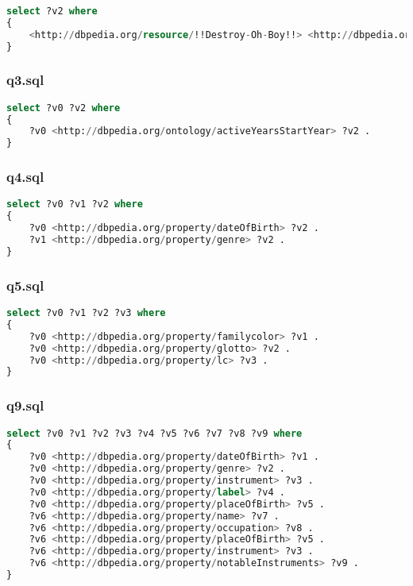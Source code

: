 \documentclass[titlepage, a4paper, 12pt] {article}
\begin{document}
\begin{lstlisting}[language=SQL] 
select ?v2 where
{
	<http://dbpedia.org/resource/!!Destroy-Oh-Boy!!> <http://dbpedia.org/property/title> ?v2 .
}
\end{lstlisting}

\subsubsection{q3.sql}

\begin{lstlisting}[language=SQL] 
select ?v0 ?v2 where
{
	?v0 <http://dbpedia.org/ontology/activeYearsStartYear> ?v2 .
}
\end{lstlisting}

\subsubsection{q4.sql}

\begin{lstlisting}[language=SQL] 
select ?v0 ?v1 ?v2 where
{
	?v0 <http://dbpedia.org/property/dateOfBirth> ?v2 .
	?v1 <http://dbpedia.org/property/genre> ?v2 .
}
\end{lstlisting}

\subsubsection{q5.sql}

\begin{lstlisting}[language=SQL] 
select ?v0 ?v1 ?v2 ?v3 where
{
	?v0 <http://dbpedia.org/property/familycolor> ?v1 .
	?v0 <http://dbpedia.org/property/glotto> ?v2 .
	?v0 <http://dbpedia.org/property/lc> ?v3 .
}
\end{lstlisting}

\subsubsection{q9.sql}

\begin{lstlisting}[language=SQL] 
select ?v0 ?v1 ?v2 ?v3 ?v4 ?v5 ?v6 ?v7 ?v8 ?v9 where
{
	?v0 <http://dbpedia.org/property/dateOfBirth> ?v1 .
	?v0 <http://dbpedia.org/property/genre> ?v2 .
	?v0 <http://dbpedia.org/property/instrument> ?v3 .
	?v0 <http://dbpedia.org/property/label> ?v4 .
	?v0 <http://dbpedia.org/property/placeOfBirth> ?v5 .
	?v6 <http://dbpedia.org/property/name> ?v7 .
	?v6 <http://dbpedia.org/property/occupation> ?v8 .
	?v6 <http://dbpedia.org/property/placeOfBirth> ?v5 .
	?v6 <http://dbpedia.org/property/instrument> ?v3 .
	?v6 <http://dbpedia.org/property/notableInstruments> ?v9 .
}
\end{lstlisting}

\clearpage
\end{document}
